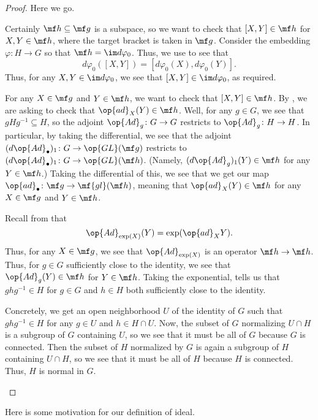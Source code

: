 \documentclass[../notes.tex]{subfiles}
\begin{document}
\begin{proof}
	Here we go.
	\begin{listalph}
		\item Certainly $\mf h\subseteq\mf g$ is a subspace, so we want to check that $[X,Y]\in\mf h$ for $X,Y\in\mf h$, where the target bracket is taken in $\mf g$. Consider the embedding $\varphi\colon H\to G$ so that $\mf h=\im d\varphi_0$. Thus, we use  to see that
		\[d\varphi_0([X,Y])=[d\varphi_0(X),d\varphi_0(Y)].\]
		Thus, for any $X,Y\in\im d\varphi_0$, we see that $[X,Y]\in\im d\varphi_0$, as required.

		\item For any $X\in\mf g$ and $Y\in\mf h$, we want to check that $[X,Y]\in\mf h$. By , we are asking to check that $\op{ad}_X(Y)\in\mf h$. Well, for any $g\in G$, we see that $gHg^{-1}\subseteq H$, so the adjoint $\op{Ad}_g\colon G\to G$ restricts to $\op{Ad}_g\colon H\to H$. In particular, by taking the differential, we see that the adjoint $(d{\op{Ad}_\bullet})_1\colon G\to\op{GL}(\mf g)$ restricts to $(d{\op{Ad}_\bullet})_1\colon G\to\op{GL}(\mf h)$. (Namely, $(d{\op{Ad}_g})_1(Y)\in\mf h$ for any $Y\in\mf h$.) Taking the differential of this, we see that we get our map $\op{ad}_\bullet\colon\mf g\to\mf{gl}(\mf h)$, meaning that $\op{ad}_X(Y)\in\mf h$ for any $X\in\mf g$ and $Y\in\mf h$.
		
		\item Recall from  that
		\[\op{Ad}_{\exp(X)}(Y)=\exp(\op{ad}_XY).\]
		Thus, for any $X\in\mf g$, we see that $\op{Ad}_{\exp(X)}$ is an operator $\mf h\to\mf h$. Thus, for $g\in G$ sufficiently close to the identity, we see that $\op{Ad}_g(Y)\in\mf h$ for $Y\in\mf h$. Taking the exponential,  tells us that $ghg^{-1}\in H$ for $g\in G$ and $h\in H$ both sufficiently close to the identity.
		
		Concretely, we get an open neighborhood $U$ of the identity of $G$ such that $ghg^{-1}\in H$ for any $g\in U$ and $h\in H\cap U$. Now, the subset of $G$ normalizing $U\cap H$ is a subgroup of $G$ containing $U$, so we see that it must be all of $G$ because $G$ is connected. Then the subset of $H$ normalized by $G$ is again a subgroup of $H$ containing $U\cap H$, so we see that it must be all of $H$ because $H$ is connected. Thus, $H$ is normal in $G$.
		\qedhere
	\end{listalph}
\end{proof}
Here is some motivation for our definition of ideal.
\end{document}
